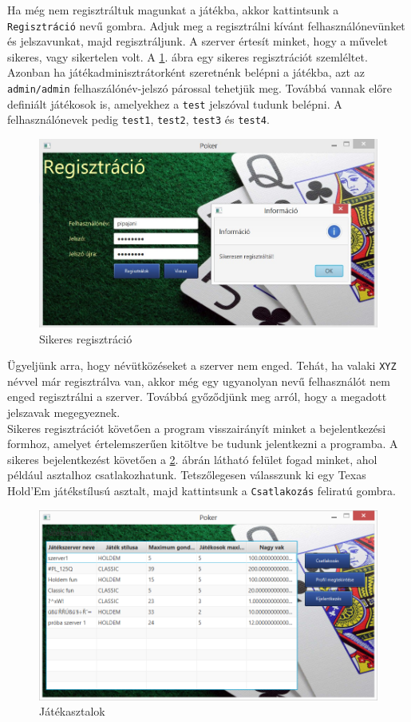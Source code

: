 Ha még nem regisztráltuk magunkat a játékba, akkor kattintsunk a \texttt{Regisztráció} nevű gombra. Adjuk meg a regisztrálni kívánt felhasználónevünket és jelszavunkat, majd regisztráljunk. A szerver értesít minket, hogy a művelet sikeres, vagy sikertelen volt. A \ref{fig:reg_succ}. ábra egy sikeres regisztrációt szemléltet. Azonban ha játékadminisztrátorként szeretnénk belépni a játékba, azt az \texttt{admin/admin} felhaszálónév-jelszó párossal tehetjük meg. Továbbá vannak előre definiált játékosok is, amelyekhez a \texttt{test} jelszóval tudunk belépni. A felhasználónevek pedig \texttt{test1}, \texttt{test2}, \texttt{test3} és \texttt{test4}.
\begin{figure}[h!]
  \caption{Sikeres regisztráció}
  \label{fig:reg_succ}
  \centering
    \includegraphics[width=\linewidth]{user-documentation/images/succ_reg.jpg}
\end{figure}
Ügyeljünk arra, hogy névütközéseket a szerver nem enged. Tehát, ha valaki \texttt{XYZ} névvel már regisztrálva van, akkor még egy ugyanolyan nevű felhasználót nem enged regisztrálni a szerver. Továbbá győződjünk meg arról, hogy a megadott jelszavak megegyeznek.  \\
Sikeres regisztrációt követően a program visszairányít minket a bejelentkezési formhoz, amelyet értelemszerűen kitöltve be tudunk jelentkezni a programba.
A sikeres bejelentkezést követően a \ref{fig:poker_tables}. ábrán látható felület fogad minket, ahol például asztalhoz csatlakozhatunk. Tetszőlegesen válasszunk ki egy Texas Hold'Em játékstílusú asztalt, majd kattintsunk a \texttt{Csatlakozás} feliratú gombra.
\begin{figure}[h!]
  \caption{Játékasztalok}
  \label{fig:poker_tables}
  \centering
    \includegraphics[width=\linewidth]{user-documentation/images/tables.jpg}
\end{figure}

